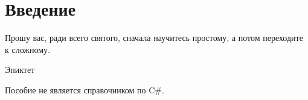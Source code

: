 \chapter*{Введение}

\epigraph{Прошу вас, ради всего святого, сначала научитесь простому, а
потом переходите к сложному.}{Эпиктет}

\lipsum[1-7]

Пособие не является справочником по C\#.
